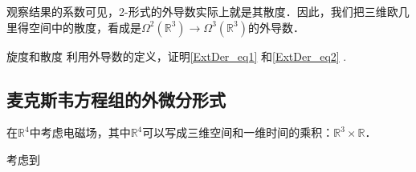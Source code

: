 观察结果的系数可见，2-形式的外导数实际上就是其散度．因此，我们把三维欧几里得空间中的散度，看成是$\Omega^2(\mathbb{R}^3)\rightarrow\Omega^3(\mathbb{R}^3)$的外导数．

\begin{exercise}{旋度和散度}
利用外导数的定义，证明\autoref{ExtDer_eq1} 和\autoref{ExtDer_eq2} .
\end{exercise}

\subsection{麦克斯韦方程组的外微分形式}

在$\mathbb{R}^4$中考虑电磁场，其中$\mathbb{R}^4$可以写成三维空间和一维时间的乘积：$\mathbb{R}^3\times\mathbb{R}$．

考虑到



